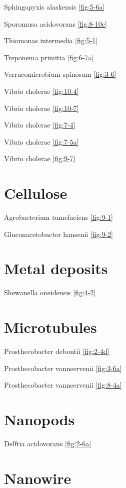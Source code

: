\documentclass[]{tufte-book}
\begin{document}
Sphingopyxis alaskensis \ref{fig:5-6a}

Sporomusa acidovorans \ref{fig:8-10c}

Thiomonas intermedia \ref{fig:5-1}

Treponema primitia \ref{fig:6-7a}

Verrucomicrobium spinosum \ref{fig:3-6}

Vibrio cholerae \ref{fig:10-4}

Vibrio cholerae \ref{fig:10-7}

Vibrio cholerae \ref{fig:7-4}

Vibrio cholerae \ref{fig:7-5a}

Vibrio cholerae \ref{fig:9-7}

\hypertarget{cellulose-1}{%
\section*{Cellulose}\label{cellulose-1}}

Agrobacterium tumefaciens \ref{fig:9-1}

Gluconacetobacter hansenii \ref{fig:9-2}

\hypertarget{metal-deposits}{%
\section*{Metal deposits}\label{metal-deposits}}

Shewanella oneidensis \ref{fig:4-2}

\hypertarget{microtubules}{%
\section*{Microtubules}\label{microtubules}}

Prosthecobacter debontii \ref{fig:2-4d}

Prosthecobacter vanneervenii \ref{fig:3-6a}

Prosthecobacter vanneervenii \ref{fig:8-4a}

\hypertarget{nanopods}{%
\section*{Nanopods}\label{nanopods}}

Delftia acidovorans \ref{fig:2-6a}

\hypertarget{nanowire}{%
\section*{Nanowire}\label{nanowire}}
\end{document}
